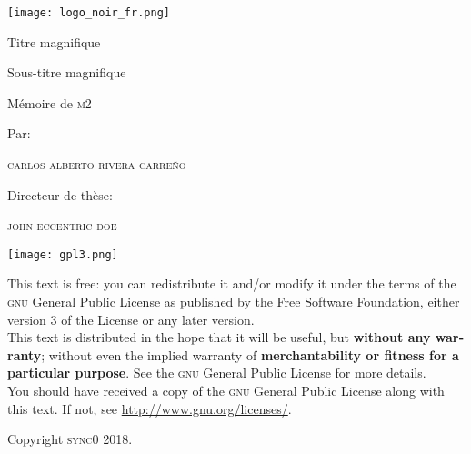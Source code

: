 \documentclass[paper=A4,portrait,twoside=true,twocolumn=false,headinclude=false,footinclude=false,fontsize=11,BCOR=15mm,DIV=calc,pagesize=auto,titlepage=firstiscover,mpinclude=true,headings=normal,headings=twolinechapter,open=right,chapterprefix=false,headsepline=false,parskip=full]{scrbook}
\author{Carlos Alberto Rivera Carreño}
\date{}
\title{}
\begin{document}
\begin{titlepage}
 \centering
 \texttt{[image: logo\_noir\_fr.png]}\par
 \vspace{4\baselineskip}
 {\Huge Titre magnifique \par}
 \vspace{1\baselineskip}
 {\Large Sous-titre magnifique \par}
\vspace*{\fill}
 {\Large Mémoire de \textsc{m2} \par}
 \vspace{2\baselineskip}
 {\large Par: \par}
 {\large \textsc{carlos alberto rivera carreño}\par}
 \vspace{1\baselineskip}
 {\large Directeur de thèse: \par}
 {\large \textsc{john eccentric doe}\par}
\end{titlepage}

\vspace*{\fill}
\noindent
\texttt{[image: gpl3.png]}\par
\vspace{1\baselineskip}
\begin{english}
\noindent
This text is free: you can redistribute it and/or modify it
under the terms of the \textsc{gnu} General Public License as published by
the Free Software Foundation, either version 3 of the License or any later
version. \\

\noindent
This text is distributed in the hope that it will be useful, but \textbf{without
any warranty}; without even the implied warranty of \textbf{merchantability or 
fitness for a particular purpose}. See the \textsc{gnu} General 
Public License for more details. \\

\noindent
You should have received a copy of the \textsc{gnu} General Public License along
with this text. If not, see \url{http://www.gnu.org/licenses/}.

\vspace{1\baselineskip}
\noindent
Copyright \textcopyright \textsc{sync0} 2018. 
\end{english}

\thispagestyle{empty}

\newpage 
\vspace*{\fill}
\end{document}
